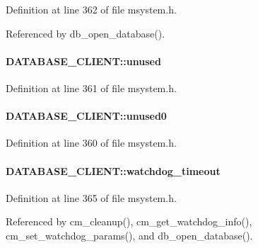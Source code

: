 Definition at line 362 of file msystem.h.

Referenced by db\_\-open\_\-database().
\paragraph[{unused}]{ {\bf DATABASE\_\-CLIENT::unused}}\hfill\label{structDATABASE__CLIENT_af98e193cc67984fb4b9ed3ca5fb2b0fe}


Definition at line 361 of file msystem.h.
\paragraph[{unused0}]{ {\bf DATABASE\_\-CLIENT::unused0}}\hfill\label{structDATABASE__CLIENT_ab8b0dccbc88a9e6ce7aab8151d40341a}


Definition at line 360 of file msystem.h.
\paragraph[{watchdog\_\-timeout}]{ {\bf DATABASE\_\-CLIENT::watchdog\_\-timeout}}\hfill\label{structDATABASE__CLIENT_ab945fdb599a2f0a7f7508b3bf8267928}


Definition at line 365 of file msystem.h.

Referenced by cm\_\-cleanup(), cm\_\-get\_\-watchdog\_\-info(), cm\_\-set\_\-watchdog\_\-params(), and db\_\-open\_\-database().